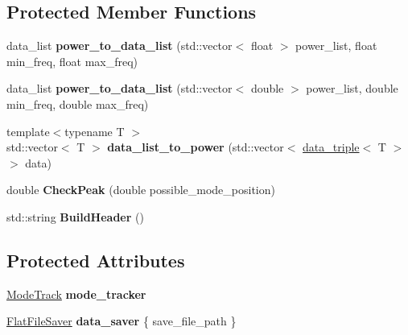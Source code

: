 \subsection*{Protected Member Functions}
\begin{DoxyCompactItemize}
\item 
data\+\_\+list {\bfseries power\+\_\+to\+\_\+data\+\_\+list} (std\+::vector$<$ float $>$ power\+\_\+list, float min\+\_\+freq, float max\+\_\+freq)\hypertarget{classetig_1_1_program_frame_a1e970cac4d1173733d27cd8f3bbaf2fb}{}\label{classetig_1_1_program_frame_a1e970cac4d1173733d27cd8f3bbaf2fb}

\item 
data\+\_\+list {\bfseries power\+\_\+to\+\_\+data\+\_\+list} (std\+::vector$<$ double $>$ power\+\_\+list, double min\+\_\+freq, double max\+\_\+freq)\hypertarget{classetig_1_1_program_frame_add41bacb448ca38d6923a2a31b71a497}{}\label{classetig_1_1_program_frame_add41bacb448ca38d6923a2a31b71a497}

\item 
{\footnotesize template$<$typename T $>$ }\\std\+::vector$<$ T $>$ {\bfseries data\+\_\+list\+\_\+to\+\_\+power} (std\+::vector$<$ \hyperlink{structdata__triple}{data\+\_\+triple}$<$ T $>$ $>$ data)\hypertarget{classetig_1_1_program_frame_aacd3bf2aed00a0ae7d6c6c99348a7f6d}{}\label{classetig_1_1_program_frame_aacd3bf2aed00a0ae7d6c6c99348a7f6d}

\item 
double {\bfseries Check\+Peak} (double possible\+\_\+mode\+\_\+position)\hypertarget{classetig_1_1_program_frame_a6bd23443debb7304d18de76d7550c8dd}{}\label{classetig_1_1_program_frame_a6bd23443debb7304d18de76d7550c8dd}

\item 
std\+::string {\bfseries Build\+Header} ()\hypertarget{classetig_1_1_program_frame_a74ffbb16b183e7b3d485183f41501e75}{}\label{classetig_1_1_program_frame_a74ffbb16b183e7b3d485183f41501e75}

\end{DoxyCompactItemize}
\subsection*{Protected Attributes}
\begin{DoxyCompactItemize}
\item 
\hyperlink{class_mode_track}{Mode\+Track} {\bfseries mode\+\_\+tracker}\hypertarget{classetig_1_1_program_frame_aea8eb7ef9e89cb2647a43e29bde12c98}{}\label{classetig_1_1_program_frame_aea8eb7ef9e89cb2647a43e29bde12c98}

\item 
\hyperlink{class_flat_file_saver}{Flat\+File\+Saver} {\bfseries data\+\_\+saver} \{ save\+\_\+file\+\_\+path \}\hypertarget{classetig_1_1_program_frame_a4338418648f4eff77b8fd7666e1938ea}{}\label{classetig_1_1_program_frame_a4338418648f4eff77b8fd7666e1938ea}

\end{DoxyCompactItemize}


